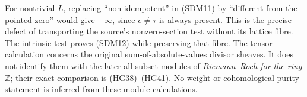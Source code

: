 For nontrivial $L$, replacing ``non-idempotent'' in (SDM11) by
``different from the pointed zero'' would give $-\infty$, since
$e\ne\tau$ is always present. This is the precise defect of
transporting the source's nonzero-section test without its lattice
fibre. The intrinsic test proves (SDM12) while preserving that fibre.
The tensor calculation concerns the original sum-of-absolute-values
divisor sheaves. It does not identify them with the later all-subset
modules of \emph{Riemann--Roch for the ring $\mathbb Z$}; their exact
comparison is (HG38)--(HG41). No weight or cohomological purity
statement is inferred from these module calculations.
